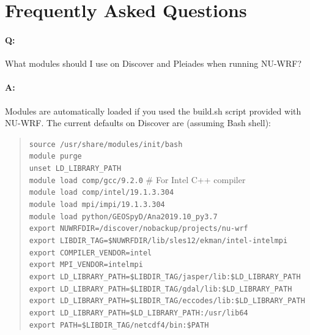 \section{Frequently Asked Questions}
\label{sec:FAQ}

\paragraph{Q:} What modules should I use on Discover and Pleiades when running
NU-WRF?

\paragraph{A:} Modules are automatically loaded if you used the build.sh script provided with NU-WRF. The current defaults on Discover are (assuming Bash shell):

\begin{quote}
\texttt{source /usr/share/modules/init/bash} \\
\texttt{module purge} \\
\texttt{unset LD\_LIBRARY\_PATH} \\
\texttt{module load comp/gcc/9.2.0}  \# For Intel C++ compiler \\
\texttt{module load comp/intel/19.1.3.304} \\
\texttt{module load mpi/impi/19.1.3.304} \\
\texttt{module load python/GEOSpyD/Ana2019.10\_py3.7} \\
\texttt{export NUWRFDIR=/discover/nobackup/projects/nu-wrf} \\
\texttt{export LIBDIR\_TAG=\$NUWRFDIR/lib/sles12/ekman/intel-intelmpi} \\
\texttt{export COMPILER\_VENDOR=intel} \\
\texttt{export MPI\_VENDOR=intelmpi} \\
\texttt{export LD\_LIBRARY\_PATH=\$LIBDIR\_TAG/jasper/lib:\$LD\_LIBRARY\_PATH} \\
\texttt{export LD\_LIBRARY\_PATH=\$LIBDIR\_TAG/gdal/lib:\$LD\_LIBRARY\_PATH} \\
\texttt{export LD\_LIBRARY\_PATH=\$LIBDIR\_TAG/eccodes/lib:\$LD\_LIBRARY\_PATH} \\
\texttt{export LD\_LIBRARY\_PATH=\$LD\_LIBRARY\_PATH:/usr/lib64} \\
\texttt{export PATH=\$LIBDIR\_TAG/netcdf4/bin:\$PATH} \\
\end{quote}

